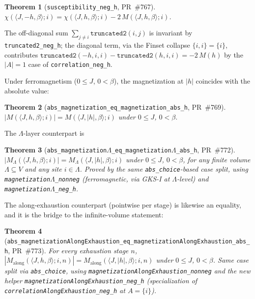 \documentclass[a4paper,11pt]{article}
\newtheorem{theorem}{Theorem}
\newcommand{\LeanLambda}{\texorpdfstring{\ensuremath{\Lambda}}{Lambda}}
\begin{document}
\begin{theorem}[\texttt{susceptibility\_neg\_h}, PR~\#767]
$\chi(\langle J,-h,\beta\rangle; i) = \chi(\langle J,h,\beta\rangle; i)
 - 2\,M(\langle J,h,\beta\rangle; i)$.
\end{theorem}
\noindent The off-diagonal sum $\sum_{j\neq i}\texttt{truncated2}(i,j)$ is
invariant by \texttt{truncated2\_neg\_h}; the diagonal term, via the
Finset collapse $\{i,i\}=\{i\}$, contributes $\texttt{truncated2}(-h,i,i)
- \texttt{truncated2}(h,i,i) = -2\,M(h)$ by the $|A|=1$ case of
\texttt{correlation\_neg\_h}.

Under ferromagnetism ($0\le J$, $0<\beta$), the magnetization at $|h|$
coincides with the absolute value:
\begin{theorem}[\texttt{abs\_magnetization\_eq\_magnetization\_abs\_h}, PR~\#769]
$|M(\langle J,h,\beta\rangle;i)| = M(\langle J,|h|,\beta\rangle;i)$
under $0\le J$, $0<\beta$.
\end{theorem}
\noindent The $\Lambda$-layer counterpart is
\begin{theorem}[\texttt{abs\_magnetization\LeanLambda\_eq\_magnetization\LeanLambda\_abs\_h}, PR~\#772]
$|M_\Lambda(\langle J,h,\beta\rangle;i)| = M_\Lambda(\langle J,|h|,\beta\rangle;i)$
under $0\le J$, $0<\beta$, for any finite volume $\Lambda \subseteq V$ and
any site $i \in \Lambda$. Proved by the same
\texttt{abs\_choice}-based case split, using
\texttt{magnetization\LeanLambda\_nonneg} (ferromagnetic, via GKS-I at
$\Lambda$-level) and \texttt{magnetization\LeanLambda\_neg\_h}.
\end{theorem}
\noindent The along-exhaustion counterpart (pointwise per stage) is
likewise an equality, and it is the bridge to the infinite-volume
statement:
\begin{theorem}[\texttt{abs\_magnetizationAlongExhaustion\_eq\_magnetizationAlongExhaustion\_abs\_h}, PR~\#773]
For every exhaustion stage $n$,
$|M_\text{along}(\langle J,h,\beta\rangle;i,n)|
= M_\text{along}(\langle J,|h|,\beta\rangle;i,n)$
under $0 \le J$, $0 < \beta$. Same case split via
\texttt{abs\_choice}, using
\texttt{magnetizationAlongExhaustion\_nonneg} and the new helper
\texttt{magnetizationAlongExhaustion\_neg\_h} (specialization of
\texttt{correlationAlongExhaustion\_neg\_h} at $A = \{i\}$).
\end{theorem}
\end{document}
